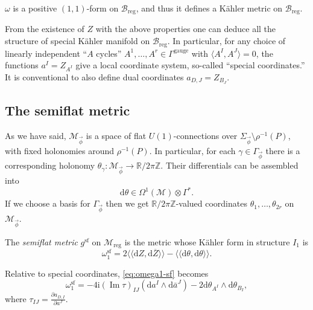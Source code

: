 \documentclass[12pt,letterpaper,reqno]{article}
\numberwithin{equation}{section}
\newcommand{\cB}{\ensuremath{\mathcal B}}
\newcommand{\cM}{\ensuremath{\mathcal M}}
\newcommand{\R}{\ensuremath{\mathbb R}}
\newcommand{\bbZ}{\ensuremath{\mathbb Z}}
\newcommand{\bbC}{\ensuremath{\mathbb C}}
\newcommand{\kahler}{K\"ahler\xspace}
\newcommand{\I}{{\mathrm i}}
\newcommand{\de}{\mathrm{d}}
\newcommand{\reg}{\mathrm{reg}}
\renewcommand{\sf}{\mathrm{sf}}
\newcommand{\gauge}{\mathrm{gauge}}
\newcommand{\IP}[1]{\langle#1\rangle}
\newcommand{\DIP}[1]{\langle\!\langle#1\rangle\!\rangle}
\newcommand{\vphi}{{\vec\phi}}
\newcommand{\ti}[1]{\textit{#1}}
\DeclareMathOperator{\im}{Im}
\newcommand{\Sp}{\mathrm{Sp}}
\begin{document}
\begin{prop} $\omega$ is a
positive $(1,1)$-form on $\cB_\reg$, and thus it defines
a \kahler metric on $\cB_\reg$.
\end{prop}

From the existence of $Z$ with the above properties
one can deduce all the structure
of special \kahler manifold on $\cB_\reg$. In particular,
for any choice of linearly independent ``$A$ cycles''
$A^1, \dots, A^r \in \Gamma^\gauge$
with $\IP{A^I, A^J} = 0$, 
the functions
$a^I = Z_{A^I}$ give a local coordinate
system, so-called ``special coordinates.''
It is conventional to also define dual coordinates
$a_{D,J} = Z_{B_J}$.




\subsection{The semiflat metric}


As we have said, $\cM_\vphi$ is a space of flat $U(1)$-connections
over $\Sigma_\vphi \setminus \rho^{-1}(P)$, 
with fixed holonomies around $\rho^{-1}(P)$.
In particular, for each $\gamma \in \Gamma_\vphi$ 
there is a corresponding
holonomy $\theta_\gamma: \cM_\vphi \to \R / 2 \pi \bbZ$.
Their differentials can be assembled into
\begin{equation}
  \de \theta \in \Omega^1(\cM) \otimes \Gamma^*.
\end{equation}
If we choose a basis for $\Gamma_\vphi$ 
then we get $\R / 2 \pi \bbZ$-valued coordinates $\theta_1, \dots, \theta_{2r}$
on $\cM_\vphi$.

\begin{defn}
The \ti{semiflat metric}  $g^\sf$ on $\cM_\reg$ is the metric 
whose \kahler form in structure $I_1$ is
\begin{equation} \label{eq:omega1-sf}
  \omega^\sf_1 = 2 \DIP{\de Z, \de \overline{Z}} - \DIP{\de \theta, \de \theta}.
\end{equation}
\end{defn}                                   
Relative to special coordinates, \eqref{eq:omega1-sf} becomes
\begin{equation}
	\omega_1^\sf = -4 \I (\im \tau)_{IJ} (\de a^I \wedge \de \bar{a}^J) - 2 \de \theta_{A^I} \wedge \de \theta_{B_I},
\end{equation}
where $\tau_{IJ} = \frac{\partial a_{D,I}}{\partial a^J}$.
\end{document}
